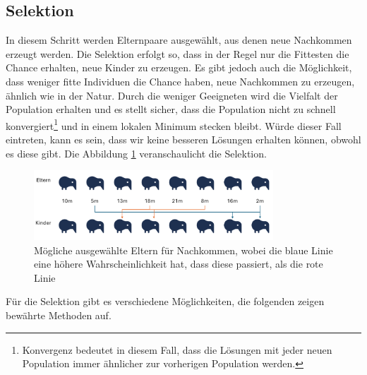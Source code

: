 %
%
%
%
\subsection{Selektion
\label{buch:paper:varalg:subsection:selection}}
%
In diesem Schritt werden Elternpaare ausgewählt, aus denen neue 
Nachkommen erzeugt werden. Die Selektion erfolgt so, dass in der 
Regel nur die Fittesten die Chance erhalten, neue Kinder zu erzeugen. 
Es gibt jedoch auch die Möglichkeit, dass weniger fitte Individuen die 
Chance haben, neue Nachkommen zu erzeugen, ähnlich wie in der Natur.
Durch die weniger Geeigneten wird die Vielfalt der Population erhalten
und es stellt sicher, dass die Population nicht zu schnell 
konvergiert\footnote{
    Konvergenz bedeutet in diesem Fall, dass die Lösungen mit jeder neuen 
    Population immer ähnlicher zur vorherigen Population werden.
    }
und in einem lokalen Minimum stecken bleibt. Würde dieser Fall eintreten, 
kann es sein, dass wir keine besseren Lösungen erhalten können, obwohl es 
diese gibt. Die Abbildung
\ref{fig:selection_of_parents} veranschaulicht die Selektion.
\begin{figure}
    \centering
    \includegraphics[width=0.8\textwidth]{
        papers/varalg/images/teil3/04OffspringProbability.png
    }
    \caption{
        Mögliche ausgewählte Eltern für Nachkommen, wobei die blaue Linie 
        eine höhere Wahrscheinlichkeit hat, dass diese passiert, als die rote Linie}
    \label{fig:selection_of_parents}
\end{figure}
Für die Selektion gibt es verschiedene Möglichkeiten, die folgenden zeigen bewährte
Methoden auf.
